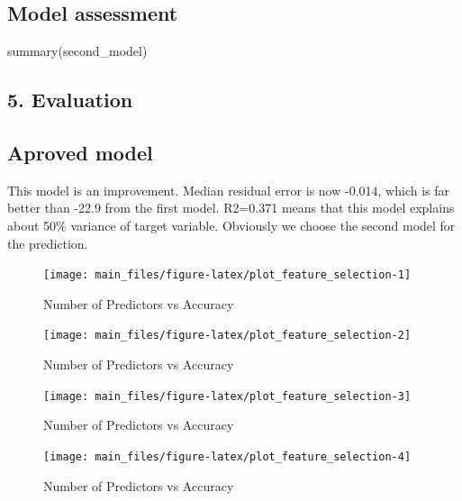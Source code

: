 \hypertarget{model-assessment-1}{%
\subsection{Model assessment}\label{model-assessment-1}}

summary(second\_model)

\hypertarget{evaluation}{%
\subsection{5. Evaluation}\label{evaluation}}

\hypertarget{aproved-model}{%
\subsection{Aproved model}\label{aproved-model}}

This model is an improvement. Median residual error is now -0.014, which
is far better than -22.9 from the first model. R2=0.371 means that this
model explains about 50\% variance of target variable. Obviously we
choose the second model for the prediction.

\begin{Schunk}
\begin{figure}[H]

{\centering \texttt{[image: main\_files/figure-latex/plot\_feature\_selection-1]} 

}

\caption[Number of Predictors vs Accuracy]{Number of Predictors vs Accuracy}\label{fig:plot_feature_selection1}
\end{figure}
\begin{figure}[H]

{\centering \texttt{[image: main\_files/figure-latex/plot\_feature\_selection-2]} 

}

\caption[Number of Predictors vs Accuracy]{Number of Predictors vs Accuracy}\label{fig:plot_feature_selection2}
\end{figure}
\begin{figure}[H]

{\centering \texttt{[image: main\_files/figure-latex/plot\_feature\_selection-3]} 

}

\caption[Number of Predictors vs Accuracy]{Number of Predictors vs Accuracy}\label{fig:plot_feature_selection3}
\end{figure}
\begin{figure}[H]

{\centering \texttt{[image: main\_files/figure-latex/plot\_feature\_selection-4]} 

}

\caption[Number of Predictors vs Accuracy]{Number of Predictors vs Accuracy}\label{fig:plot_feature_selection4}
\end{figure}
\end{Schunk}

